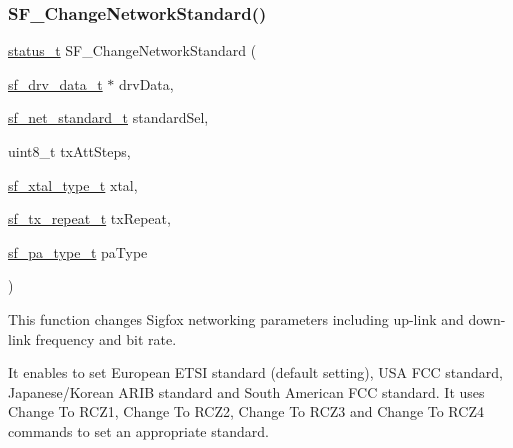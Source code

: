 \subsubsection{\texorpdfstring{SF\_ChangeNetworkStandard()}{SF\_ChangeNetworkStandard()}}
{\footnotesize\ttfamily \mbox{\hyperlink{group__ksdk__common_gaaabdaf7ee58ca7269bd4bf24efcde092}{status\+\_\+t}} S\+F\+\_\+\+Change\+Network\+Standard (\begin{DoxyParamCaption}\item[{\mbox{\hyperlink{structsf__drv__data__t}{sf\+\_\+drv\+\_\+data\+\_\+t}} $\ast$}]{drv\+Data,  }\item[{\mbox{\hyperlink{group__sf__enum__group_ga9ad07e4b666d7d70f7a69614ecb89421}{sf\+\_\+net\+\_\+standard\+\_\+t}}}]{standard\+Sel,  }\item[{uint8\+\_\+t}]{tx\+Att\+Steps,  }\item[{\mbox{\hyperlink{group__sf__enum__group_ga921cd8c6964917cde98f2a132c5548d5}{sf\+\_\+xtal\+\_\+type\+\_\+t}}}]{xtal,  }\item[{\mbox{\hyperlink{group__sf__enum__group_ga7d2f06984784542a95d02e422a42d9cf}{sf\+\_\+tx\+\_\+repeat\+\_\+t}}}]{tx\+Repeat,  }\item[{\mbox{\hyperlink{group__sf__enum__group_gac746e971077ef8c8dac9d26a8b47a2f9}{sf\+\_\+pa\+\_\+type\+\_\+t}}}]{pa\+Type }\end{DoxyParamCaption})}



This function changes Sigfox networking parameters including up-\/link and down-\/link frequency and bit rate. 

It enables to set European E\+T\+SI standard (default setting), U\+SA F\+CC standard, Japanese/\+Korean A\+R\+IB standard and South American F\+CC standard. It uses Change To R\+C\+Z1, Change To R\+C\+Z2, Change To R\+C\+Z3 and Change To R\+C\+Z4 commands to set an appropriate standard.


